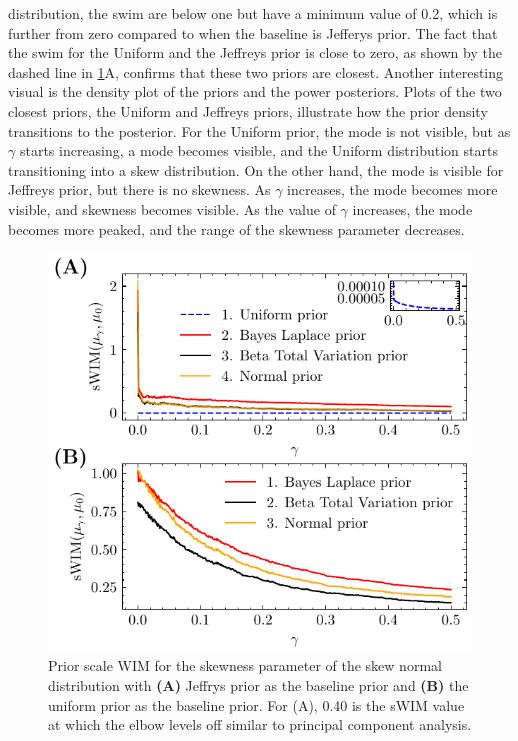 \documentclass[12pt]{article}
\begin{document}
distribution, the \gls{swim} are below one but have a minimum value of 0.2,
which is further from zero compared to when the baseline is Jefferys prior. The
fact that the \gls{swim} for the Uniform and the Jeffreys prior is close to
zero, as shown by the dashed line in \cref{fig:swimdistskew}A, confirms that
these two priors are closest. Another interesting visual is the density plot of
the priors and the power posteriors. Plots of the two closest priors, the
Uniform and Jeffreys priors, illustrate how the prior density transitions to
the posterior. For the Uniform prior, the mode is not visible, but as $\gamma$
starts increasing, a mode becomes visible, and the Uniform distribution starts
transitioning into a skew distribution. On the other hand, the mode is visible
for Jeffreys prior, but there is no skewness. As $\gamma$ increases, the mode
becomes more visible, and skewness becomes visible. As the value of $\gamma$
increases, the mode becomes more peaked, and the range of the skewness
parameter decreases.


\begin{figure}[h]
\begin{center}
\includegraphics{imgs/swim_distskew.pdf}
\end{center}
\caption{Prior scale WIM for the skewness parameter of the skew normal distribution with \textbf{(A)} Jeffrys prior as the baseline prior and \textbf{(B)} the uniform prior as the baseline prior. For (A), 0.40 is the sWIM value at which the elbow levels off similar to principal component analysis.}\label{fig:swimdistskew}
\end{figure}
\end{document}
